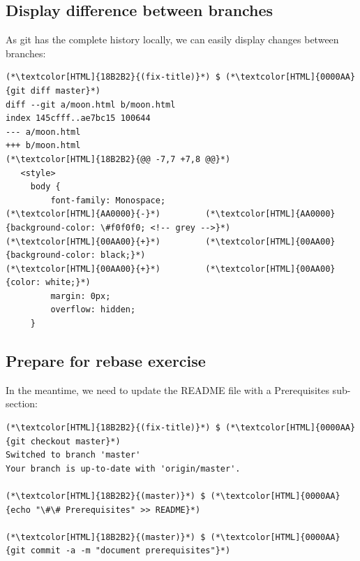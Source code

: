\subsection{Display difference between branches}
\begin{frame}[fragile]
  \subslidetitle

  As git has the complete history locally, we can easily display changes between branches:

  \begin{lstlisting}
(*\textcolor[HTML]{18B2B2}{(fix-title)}*) $ (*\textcolor[HTML]{0000AA}{git diff master}*)
diff --git a/moon.html b/moon.html
index 145cfff..ae7bc15 100644
--- a/moon.html
+++ b/moon.html
(*\textcolor[HTML]{18B2B2}{@@ -7,7 +7,8 @@}*)
   <style>
     body {
         font-family: Monospace;
(*\textcolor[HTML]{AA0000}{-}*)         (*\textcolor[HTML]{AA0000}{background-color: \#f0f0f0; <!-- grey -->}*)
(*\textcolor[HTML]{00AA00}{+}*)         (*\textcolor[HTML]{00AA00}{background-color: black;}*)
(*\textcolor[HTML]{00AA00}{+}*)         (*\textcolor[HTML]{00AA00}{color: white;}*)
         margin: 0px;
         overflow: hidden;
     }
\end{lstlisting}
\end{frame}

\subsection{Prepare for rebase exercise}
\begin{frame}[fragile]
  \subslidetitle

  In the meantime, we need to update the README file with a Prerequisites sub-section:
  \begin{lstlisting}
(*\textcolor[HTML]{18B2B2}{(fix-title)}*) $ (*\textcolor[HTML]{0000AA}{git checkout master}*)
Switched to branch 'master'
Your branch is up-to-date with 'origin/master'.

(*\textcolor[HTML]{18B2B2}{(master)}*) $ (*\textcolor[HTML]{0000AA}{echo "\#\# Prerequisites" >> README}*)

(*\textcolor[HTML]{18B2B2}{(master)}*) $ (*\textcolor[HTML]{0000AA}{git commit -a -m "document prerequisites"}*)
\end{lstlisting}

\end{frame}

